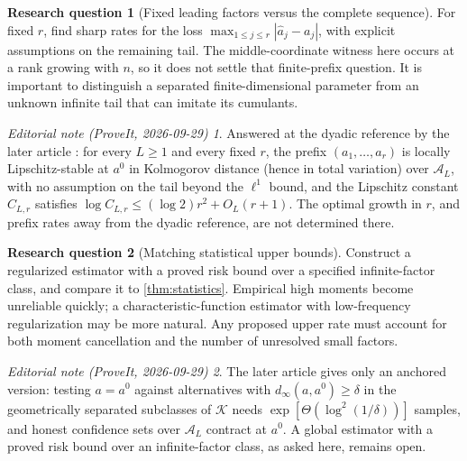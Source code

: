 \documentclass[11pt,a4paper]{article}
\theoremstyle{definition}
\newtheorem{question}{Research question}
\theoremstyle{remark}
\newtheorem*{ednote}{Editorial note (ProveIt, 2026-09-29)}
\newcommand{\A}{\mathcal A}
\newcommand{\K}{\mathcal K}
\begin{document}
\begin{question}[Fixed leading factors versus the complete sequence]
For fixed $r$, find sharp rates for the loss
$\max_{1\le j\le r}|\widehat a_j-a_j|$, with explicit assumptions on
the remaining tail. The middle-coordinate witness here occurs at a
rank growing with $n$, so it does not settle that finite-prefix question.
It is important to distinguish a separated finite-dimensional parameter
from an unknown infinite tail that can imitate its cumulants.
\end{question}
\begin{ednote}
Answered at the dyadic reference by the later article
: for every $L\ge1$
and every fixed $r$, the prefix $(a_1,\dots,a_r)$ is locally
Lipschitz-stable at $a^0$ in Kolmogorov distance (hence in total variation)
over $\A_L$, with no assumption on the tail beyond the $\ell^1$ bound, and
the Lipschitz constant $C_{L,r}$ satisfies
$\log C_{L,r}\le(\log2)r^2+O_L(r+1)$. The optimal growth in $r$, and
prefix rates away from the dyadic reference, are not determined there.
\end{ednote}

\begin{question}[Matching statistical upper bounds]
Construct a regularized estimator with a proved risk bound over a
specified infinite-factor class, and compare it to
\cref{thm:statistics}. Empirical high moments become unreliable quickly;
a characteristic-function estimator with low-frequency regularization
may be more natural. Any proposed upper rate must account for both
moment cancellation and the number of unresolved small factors.
\end{question}
\begin{ednote}
The later article
 gives only an
anchored version: testing $a=a^0$ against alternatives with
$d_\infty(a,a^0)\ge\delta$ in the geometrically separated subclasses of
$\K$ needs $\exp[\Theta(\log^2(1/\delta))]$ samples, and honest confidence
sets over $\A_L$ contract at $a^0$. A global estimator with a proved risk
bound over an infinite-factor class, as asked here, remains open.
\end{ednote}
\end{document}
